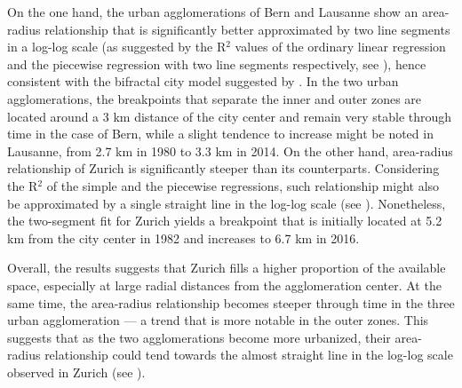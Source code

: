 On the one hand, the urban agglomerations of Bern and Lausanne show an area-radius relationship that is significantly better approximated by two line segments in a log-log scale (as suggested by the R$^2$ values of the ordinary linear regression and the piecewise regression with two line segments respectively, see ), hence consistent with the bifractal city model suggested by \cite{white1993cellular}.
In the two urban agglomerations, the breakpoints that separate the inner and outer zones are located around a 3 km distance of the city center and remain very stable through time in the case of Bern, while a slight tendence to increase might be noted in Lausanne, from 2.7 km in 1980 to 3.3 km in 2014.
On the other hand, area-radius relationship of Zurich is significantly steeper than its counterparts. Considering the R$^2$ of the simple and the piecewise regressions, such relationship might also be approximated by a single straight line in the log-log scale (see ).
Nonetheless, the two-segment fit for Zurich yields a breakpoint that is initially located at 5.2 km from the city center in 1982 and increases to 6.7 km in 2016.

Overall, the results suggests that Zurich fills a higher proportion of the available space, especially at large radial distances from the agglomeration center.
At the same time, the area-radius relationship becomes steeper through time in the three urban agglomeration --- a trend that is more notable in the outer zones.
This suggests that as the two agglomerations become more urbanized, their area-radius relationship could tend towards the almost straight line in the log-log scale observed in Zurich (see ).  %




